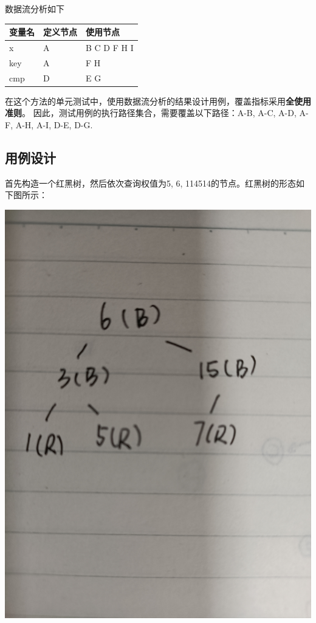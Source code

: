 \documentclass[12pt, a4paper, oneside]{ctexart}
\begin{document}
数据流分析如下

\begin{table}[!h]
    \begin{tabular}{|l|l|l|}
    \hline
    变量名 & 定义节点 & 使用节点 \\ \hline
    x & A & B C D F H I\\ \hline
    key & A & F H \\ \hline
    cmp & D & E G \\ \hline
    \end{tabular}
\end{table}

在这个方法的单元测试中，使用数据流分析的结果设计用例，覆盖指标采用\textbf{全使用准则}。
因此，测试用例的执行路径集合，需要覆盖以下路径：A-B, A-C, A-D, A-F, A-H, A-I, D-E, D-G.

\subsection{用例设计}

首先构造一个红黑树，然后依次查询权值为5, 6, 114514的节点。红黑树的形态如下图所示：

\includegraphics[scale=0.07]{screenshots/RBT-search.jpg}
\end{document}
